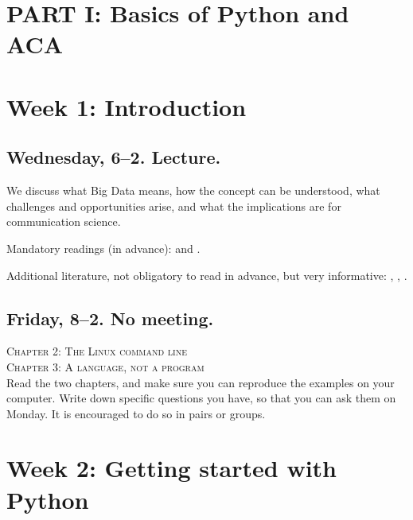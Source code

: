\documentclass[a4paper,10pt]{report}
\begin{document}
\section*{PART I: Basics of Python and ACA}

\section*{Week 1: Introduction}
\subsection*{Wednesday, 6--2. Lecture.}
We discuss what Big Data means, how the concept can be understood, what challenges and opportunities arise, and what the implications are for communication science. 

Mandatory readings (in advance): \cite{boyd2012} and \cite{Kitchin2014}. 

Additional literature, not obligatory to read in advance, but very informative: \cite{Mahrt2013}, \cite{Vis2013}, \cite{Trilling2017a}.



\subsection*{Friday, 8--2. No meeting.}
\textsc{ Chapter 2: The Linux command line}\\
\textsc{ Chapter 3: A language, not a program}\\

Read the two chapters, and make sure you can reproduce the examples on your computer. Write down specific questions you have, so that you can ask them on Monday. It is encouraged to do so in pairs or groups.




\section*{Week 2: Getting started with Python}
\end{document}
